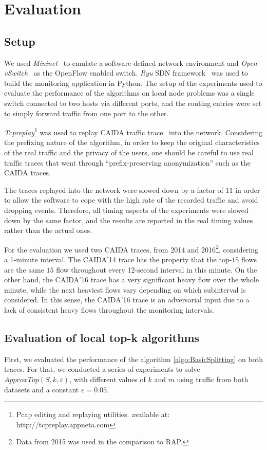 \section{Evaluation}
\subsection{Setup}
We used \textit{Mininet}~\cite{conf/hotnets/LantzHM10, Mininet} to emulate a software-defined network environment and \textit{Open vSwitch}~\cite{Pfaff2009, OVS} as the OpenFlow enabled switch. \textit{Ryu} SDN framework~\cite{Ryu} was used to build the monitoring application in Python. The setup of the experiments used to evaluate the performance of the algorithms on local node problems was a single switch connected to two hosts via different ports, and the routing entries were set to simply forward traffic from one port to the other.

\textit{Tcpreplay}\footnote{Pcap editing and replaying utilities. available at: http://tcpreplay.appneta.com} was used to replay CAIDA traffic trace~\cite{CAIDA14, CAIDA2016} into the network. Considering the prefixing nature of the algorithm, in order to keep the original characteristics of the real traffic and the privacy of the users, one should be careful to use real traffic traces that went through ``prefix-preserving anonymization'' such as the CAIDA traces.

The traces replayed into the network were slowed down by a factor of $11$ in order to allow the software to cope with the high rate of the recorded traffic and avoid dropping events. Therefore, all timing aspects of the experiments were slowed down by the same factor, and the results are reported in the real timing values rather than the actual ones.

For the evaluation we used two CAIDA traces, from 2014 and 2016\footnote{Data from 2015 was used in the comparison to RAP.}, considering a 1-minute interval. The CAIDA'14 trace has the property that the top-$15$ flows are the same $15$ flow throughout every 12-second interval in this minute.
On the other hand, the CAIDA'16 trace has a very significant heavy flow over the whole minute, while the next heaviest flows vary depending on which subinterval is considered. In this sense, the CAIDA'16 trace is an adversarial input due to a lack of consistent heavy flows throughout the monitoring intervals.

\subsection{Evaluation of local top-k algorithms}
First, we evaluated the performance of the algorithm \ref{algo:BasicSplitting} on both traces. For that, we conducted a series of experiments to solve $ApproxTop(S,k,\varepsilon)$, with different values of $k$ and $m$ using traffic from both datasets and a constant $\varepsilon=0.05$.

